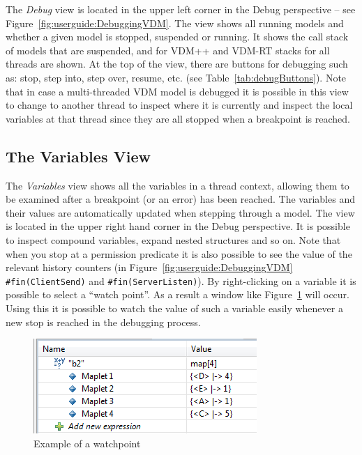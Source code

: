 \documentclass{overturerepchap}
\begin{document}
The \emph{Debug} view is located in the upper left corner in the Debug perspective --
see Figure~\ref{fig:userguide:DebuggingVDM}. The view shows all running
models and whether a given model is stopped, suspended or running.
It shows the call stack of models that are suspended, and for VDM++ and VDM-RT stacks
for all threads are shown.
At the top of the view, there are buttons
for debugging such as: stop, step into, step over, resume, etc. (see
Table~\ref{tab:debugButtons}). Note that in case a multi-threaded VDM
model is debugged it is possible in this view to change to another
thread to inspect where it is currently and inspect the local
variables at that thread since they are all stopped when a breakpoint
is reached.

\subsection{The Variables View}
 
The \emph{Variables} view shows all the variables in a thread context, allowing them to be
examined after a breakpoint (or an error) has been reached. The variables and their values are
automatically updated when stepping through a model. The view is
located in the upper right hand corner in the Debug perspective. It is
possible to inspect compound variables, expand nested structures and
so on. Note that when you stop at a permission predicate it is also
possible to see the value of the relevant history counters (in
Figure~\ref{fig:userguide:DebuggingVDM} \texttt{\#fin(ClientSend)} and
\texttt{\#fin(ServerListen)}). By right-clicking on a variable it is
possible to select a ``watch point''. As a result a window like
Figure~\ref{fig:watchpoint} will occur. Using this it is possible to
watch the value of such a variable easily whenever a new stop is
reached in the debugging process.

\begin{figure}[htp]
\begin{center}
  \includegraphics[width=.5\textwidth]{screenDumps/watchpoint}
  \caption{Example of a watchpoint}
  \label{fig:watchpoint}
\end{center}
\end{figure}
\end{document}
